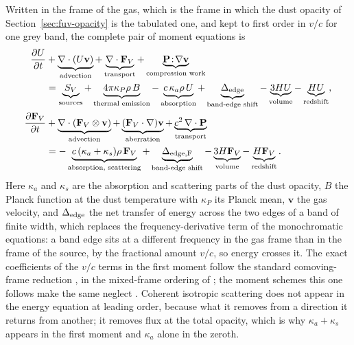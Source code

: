 Written in the frame of the gas, which is the frame in which the dust
opacity of Section~\ref{sec:fuv-opacity} is the tabulated one, and kept to
first order in $v/c$ for one grey band, the complete pair of moment
equations is
\begin{align}
  \frac{\partial U}{\partial t}
    &+ \underbrace{\nabla\cdot(U\mathbf v)}_{\text{advection}}
    + \underbrace{\nabla\cdot\mathbf F_V}_{\text{transport}}
    + \underbrace{\mathbf P\!:\!\nabla\mathbf v}_{\text{compression work}}
  \nonumber \\
  &= \underbrace{S_V}_{\text{sources}}
    + \underbrace{4\pi\kappa_P\rho\,B}_{\text{thermal emission}}
    - \underbrace{c\,\kappa_a\rho\,U}_{\text{absorption}}
    + \underbrace{\Delta_{\rm edge}}_{\text{band-edge shift}}
    - \underbrace{3HU}_{\text{volume}}
    - \underbrace{HU}_{\text{redshift}} ,
  \label{eq:fuv-full-moment-zero} \\
  \frac{\partial \mathbf F_V}{\partial t}
    &+ \underbrace{\nabla\cdot(\mathbf F_V\otimes\mathbf v)}_{\text{advection}}
    + \underbrace{(\mathbf F_V\cdot\nabla)\mathbf v}_{\text{aberration}}
    + \underbrace{c^2\,\nabla\cdot\mathbf P}_{\text{transport}}
  \nonumber \\
  &= -\underbrace{c\,(\kappa_a+\kappa_s)\rho\,\mathbf F_V}
        _{\text{absorption, scattering}}
    + \underbrace{\Delta_{\rm edge,F}}_{\text{band-edge shift}}
    - \underbrace{3H\mathbf F_V}_{\text{volume}}
    - \underbrace{H\mathbf F_V}_{\text{redshift}} .
  \label{eq:fuv-full-moment-one}
\end{align}
Here $\kappa_a$ and $\kappa_s$ are the absorption and scattering parts of
the dust opacity, $B$ the Planck function at the dust temperature with
$\kappa_P$ its Planck mean, $\mathbf v$ the gas velocity, and $\Delta_{\rm
edge}$ the net transfer of energy across the two edges of a band of finite
width, which replaces the frequency-derivative term of the monochromatic
equations: a band edge sits at a different frequency in the gas frame than
in the frame of the source, by the fractional amount $v/c$, so energy
crosses it. The exact coefficients of the $v/c$ terms in the first moment
follow the standard comoving-frame reduction
\citep{MihalasMihalas1984}, in the mixed-frame ordering of
\citet{Lowrie1999}; the moment schemes this one follows make the same
neglect \citep{Rosdahl2013,Chan2021}. Coherent isotropic scattering does not appear in the
energy equation at leading order, because what it removes from a direction
it returns from another; it removes flux at the total opacity, which is why
$\kappa_a+\kappa_s$ appears in the first moment and $\kappa_a$ alone in the
zeroth.

